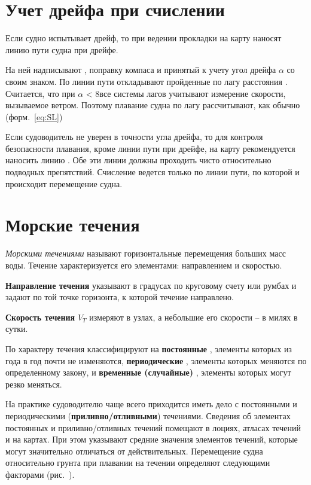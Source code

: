 \section{Учет дрейфа при счислении}

Если судно испытывает дрейф, то при ведении прокладки на карту наносят
линию пути судна при дрейфе.

На ней надписывают \KK, поправку компаса и принятый к учету угол
дрейфа $\alpha$ со своим знаком. По линии пути откладывают пройденные
по лагу расстояния . Считается, что при $\alpha$ < 8\gr все системы лагов учитывают измерение скорости, вызываемое
ветром. Поэтому плавание судна по лагу рассчитывают, как обычно
(форм.~\ref{eq:SL})

Если судоводитель не уверен в точности угла дрейфа, то для контроля
безопасности плавания, кроме линии пути при дрейфе, на карту
рекомендуется наносить линию \IK. Обе эти линии должны проходить чисто
относительно подводных препятствий. Счисление ведется только по линии
пути, по которой и происходит перемещение судна.

\section{Морские течения}

\textit{Морскими течениями}  называют
горизонтальные перемещения больших масс воды. Течение характеризуется
его элементами: направлением и скоростью.

\textbf{Направление течения} 
  указывают в градусах по
круговому счету или румбах и задают по той точке горизонта, к которой
течение направлено.

\textbf{Скорость течения} 
 $V_T$ измеряют в узлах, а небольшие его
скорости \--- в милях в сутки.

По характеру течения классифицируют на \textbf{постоянные}
, элементы которых из года в год почти не
изменяются, \textbf{периодические} ,
элементы которых меняются по определенному закону, и \textbf{временные
  (случайные)}  ,
элементы которых могут резко меняться.

На практике судоводителю чаще всего приходится иметь дело с
постоянными и периодическими (\textbf{приливно\-/отливными})
 течениями. Сведения об элементах
постоянных и приливно\-/отливных течений помещают в лоциях, атласах
течений и на картах. При этом указывают средние значения элементов
течений, которые могут значительно отличаться от
действительных. Перемещение судна относительно грунта при плавании на
течении определяют следующими факторами (рис.~).

